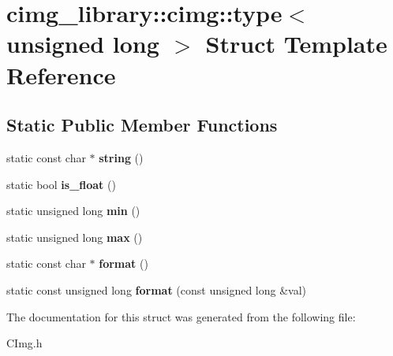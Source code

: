 \hypertarget{structcimg__library_1_1cimg_1_1type_3_01unsigned_01long_01_4}{\section{cimg\-\_\-library\-:\-:cimg\-:\-:type$<$ unsigned long $>$ Struct Template Reference}
\label{structcimg__library_1_1cimg_1_1type_3_01unsigned_01long_01_4}
}
\subsection*{Static Public Member Functions}
\begin{DoxyCompactItemize}
\item 
\hypertarget{structcimg__library_1_1cimg_1_1type_3_01unsigned_01long_01_4_a7b3e1b030d0608ba7e5202bb54f0630b}{static const char $\ast$ {\bfseries string} ()}\label{structcimg__library_1_1cimg_1_1type_3_01unsigned_01long_01_4_a7b3e1b030d0608ba7e5202bb54f0630b}

\item 
\hypertarget{structcimg__library_1_1cimg_1_1type_3_01unsigned_01long_01_4_afd0c1907bd8f80509ee39c3649276320}{static bool {\bfseries is\-\_\-float} ()}\label{structcimg__library_1_1cimg_1_1type_3_01unsigned_01long_01_4_afd0c1907bd8f80509ee39c3649276320}

\item 
\hypertarget{structcimg__library_1_1cimg_1_1type_3_01unsigned_01long_01_4_a50112343935a0241085a17034b55288c}{static unsigned long {\bfseries min} ()}\label{structcimg__library_1_1cimg_1_1type_3_01unsigned_01long_01_4_a50112343935a0241085a17034b55288c}

\item 
\hypertarget{structcimg__library_1_1cimg_1_1type_3_01unsigned_01long_01_4_a97dd1fea8097c42d17b0c273dd23bd53}{static unsigned long {\bfseries max} ()}\label{structcimg__library_1_1cimg_1_1type_3_01unsigned_01long_01_4_a97dd1fea8097c42d17b0c273dd23bd53}

\item 
\hypertarget{structcimg__library_1_1cimg_1_1type_3_01unsigned_01long_01_4_a771148fa3d2e90406a3c0009bf90e9ce}{static const char $\ast$ {\bfseries format} ()}\label{structcimg__library_1_1cimg_1_1type_3_01unsigned_01long_01_4_a771148fa3d2e90406a3c0009bf90e9ce}

\item 
\hypertarget{structcimg__library_1_1cimg_1_1type_3_01unsigned_01long_01_4_a7eba0702ca211bfa102b3c40598c4595}{static const unsigned long {\bfseries format} (const unsigned long \&val)}\label{structcimg__library_1_1cimg_1_1type_3_01unsigned_01long_01_4_a7eba0702ca211bfa102b3c40598c4595}

\end{DoxyCompactItemize}


The documentation for this struct was generated from the following file\-:\begin{DoxyCompactItemize}
\item 
C\-Img.\-h\end{DoxyCompactItemize}
